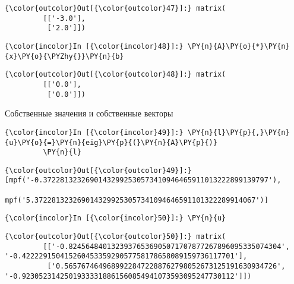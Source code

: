             \begin{Verbatim}[commandchars=\\\{\}]
{\color{outcolor}Out[{\color{outcolor}47}]:} matrix(
         [['-3.0'],
          ['2.0']])
\end{Verbatim}
        
    \begin{Verbatim}[commandchars=\\\{\}]
{\color{incolor}In [{\color{incolor}48}]:} \PY{n}{A}\PY{o}{*}\PY{n}{x}\PY{o}{\PYZhy{}}\PY{n}{b}
\end{Verbatim}

            \begin{Verbatim}[commandchars=\\\{\}]
{\color{outcolor}Out[{\color{outcolor}48}]:} matrix(
         [['0.0'],
          ['0.0']])
\end{Verbatim}
        
    Собственные значения и собственные векторы

    \begin{Verbatim}[commandchars=\\\{\}]
{\color{incolor}In [{\color{incolor}49}]:} \PY{n}{l}\PY{p}{,}\PY{n}{u}\PY{o}{=}\PY{n}{eig}\PY{p}{(}\PY{n}{A}\PY{p}{)}
         \PY{n}{l}
\end{Verbatim}

            \begin{Verbatim}[commandchars=\\\{\}]
{\color{outcolor}Out[{\color{outcolor}49}]:} [mpf('-0.37228132326901432992530573410946465911013222899139797'),
          mpf('5.3722813232690143299253057341094646591101322289914067')]
\end{Verbatim}
        
    \begin{Verbatim}[commandchars=\\\{\}]
{\color{incolor}In [{\color{incolor}50}]:} \PY{n}{u}
\end{Verbatim}

            \begin{Verbatim}[commandchars=\\\{\}]
{\color{outcolor}Out[{\color{outcolor}50}]:} matrix(
         [['-0.82456484013239376536905071707877267896095335074304', '-0.42222915041526045335929057758178658089159736117701'],
          ['0.56576746496899228472288762798052673125191630934726', '-0.92305231425019333318861560854941073593095247730112']])
\end{Verbatim}
        
